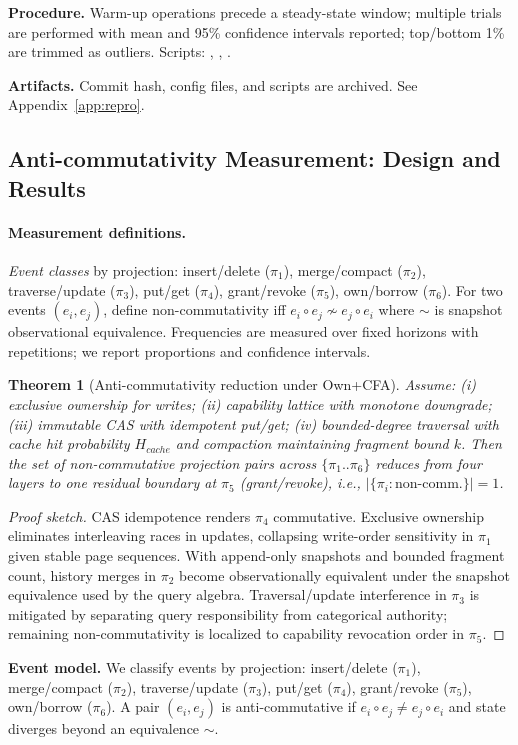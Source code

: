 \documentclass[10pt]{article}
\newtheorem{theorem}{Theorem}
\begin{document}
\textbf{Procedure.} Warm-up operations precede a steady-state window; multiple trials are performed with mean and 95\% confidence intervals reported; top/bottom 1\% are trimmed as outliers. Scripts: \texttt{}, \texttt{}, \texttt{}.

\textbf{Artifacts.} Commit hash, config files, and scripts are archived. See Appendix~\ref{app:repro}.

\subsection{Anti-commutativity Measurement: Design and Results}
\paragraph{Measurement definitions.}
\emph{Event classes} by projection: insert/delete ($\pi_1$), merge/compact ($\pi_2$), traverse/update ($\pi_3$), put/get ($\pi_4$), grant/revoke ($\pi_5$), own/borrow ($\pi_6$). For two events $(e_i,e_j)$, define non-commutativity iff $e_i\circ e_j\not\sim e_j\circ e_i$ where $\sim$ is snapshot observational equivalence. Frequencies are measured over fixed horizons with repetitions; we report proportions and confidence intervals.
\begin{theorem}[Anti-commutativity reduction under Own+CFA]
Assume: (i) exclusive ownership for writes; (ii) capability lattice with monotone downgrade; (iii) immutable CAS with idempotent put/get; (iv) bounded-degree traversal with cache hit probability $H_{cache}$ and compaction maintaining fragment bound $k$. Then the set of non-commutative projection pairs across $\{\pi_1..\pi_6\}$ reduces from four layers to one residual boundary at $\pi_5$ (grant/revoke), i.e., $|\{\pi_i:\text{non-comm.}\}|=1$.
\end{theorem}
\begin{proof}[Proof sketch]
CAS idempotence renders $\pi_4$ commutative. Exclusive ownership eliminates interleaving races in updates, collapsing write-order sensitivity in $\pi_1$ given stable page sequences. With append-only snapshots and bounded fragment count, history merges in $\pi_2$ become observationally equivalent under the snapshot equivalence used by the query algebra. Traversal/update interference in $\pi_3$ is mitigated by separating query responsibility from categorical authority; remaining non-commutativity is localized to capability revocation order in $\pi_5$.
\end{proof}
\textbf{Event model.} We classify events by projection: insert/delete ($\pi_1$), merge/compact ($\pi_2$), traverse/update ($\pi_3$), put/get ($\pi_4$), grant/revoke ($\pi_5$), own/borrow ($\pi_6$). A pair $(e_i,e_j)$ is anti-commutative if $e_i\circ e_j\ne e_j\circ e_i$ and state diverges beyond an equivalence $\sim$.
\end{document}
